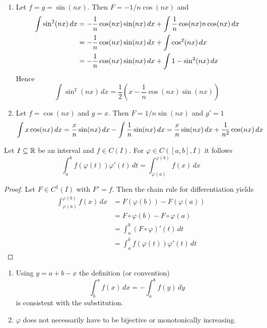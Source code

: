 \begin{examples}\hfill
    \begin{enumerate}
        \item Let \( f = g = \sin(nx) \). Then \( F = -1/n \cos(nx) \) and
              \[
                  \begin{split}
                      \int \sin^2(nx)\,dx
                      & = -\frac{1}{n} \cos(nx)\sin(nx)\,dx + \int \frac{1}{n} \cos(nx) n \cos(nx)\,dx \\
                      & = -\frac{1}{n} \cos(nx)\sin(nx)\,dx + \int \cos^2(nx)\,dx \\
                      & = -\frac{1}{n} \cos(nx)\sin(nx)\,dx + \int 1 - \sin^2(nx)\,dx
                  \end{split}
              \]
              Hence
              \[
                  \int \sin^2(nx)\,dx = \frac{1}{2}(x - \frac{1}{n}\cos(nx)\sin(nx))
              \]
        \item Let \( f = \cos(nx) \) and \(g = x \). Then \( F = 1/n \sin(nx) \) and \( g'= 1 \)
              \[
                  \int x\cos(nx)\,dx
                  = \frac{x}{n} \sin(nx)\,dx - \int \frac{1}{n} \sin(nx)\,dx
                  = \frac{x}{n} \sin(nx)\,dx + \frac{1}{n^2} \cos(nx)\,dx
              \]
    \end{enumerate}
\end{examples}
\bigskip


\begin{lemma}
    Let \( I \subseteq \mathbb{R} \) be an interval and \( f \in C(I) \). For \( \varphi \in C([a,b], I) \) it follows
    \[
        \int_{a}^{b} f(\varphi(t))\varphi'(t)\,dt = \int_{\varphi(a)}^{\varphi(b)} f(x)\,dx
    \]
\end{lemma}
\begin{proof}
    Let \( F \in C^1(I) \) with \( F' = f \). Then the chain rule for differentiation yields
    \[
        \begin{split}
            \int_{\varphi(a)}^{\varphi(b)} f(x)\,dx
            &= F(\varphi(b)) - F(\varphi(a)) \\
            &= F\circ\varphi(b) - F\circ\varphi(a) \\
            &= \int_{a}^{b} (F\circ\varphi)'(t)\,dt \\
            &= \int_{a}^{b} f(\varphi(t))\varphi'(t)\,dt
        \end{split}
    \]
\end{proof}
\bigskip

\begin{remarks}\hfill
    \begin{enumerate}
        \item Using \( y = a + b - x \) the definition (or convention)
              \[
                  \int_b^a f(x)\,dx = - \int_a^b f(y)\,dy
              \]
              is consistent with the substitution.
        \item \( \varphi \) does not necessarily have to be bijective or monotonically increasing.
    \end{enumerate}
\end{remarks}
\bigskip


